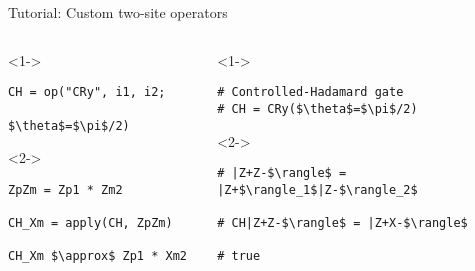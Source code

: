 \begin{frame}[fragile]{Tutorial: Custom two-site operators}


\begin{columns}

\begin{column}{5cm}

\begin{onlyenv}<1->

\begin{lstlisting}[language=JuliaLocal, style=julia, mathescape, basicstyle=\small]
CH = op("CRy", i1, i2;
             $\theta$=$\pi$/2)
\end{lstlisting}

\end{onlyenv}

\begin{onlyenv}<2->

\begin{lstlisting}[language=JuliaLocal, style=julia, mathescape, basicstyle=\small]
ZpZm = Zp1 * Zm2

CH_Xm = apply(CH, ZpZm)

CH_Xm $\approx$ Zp1 * Xm2
\end{lstlisting}

\end{onlyenv}

\end{column}

\begin{column}{5cm}

\begin{onlyenv}<1->

\begin{lstlisting}[style=julia, numbers=none, mathescape, basicstyle=\small]
# Controlled-Hadamard gate
# CH = CRy($\theta$=$\pi$/2)
\end{lstlisting}

\end{onlyenv}

\begin{onlyenv}<2->

\begin{lstlisting}[style=julia, numbers=none, mathescape, basicstyle=\small]
# |Z+Z-$\rangle$ = |Z+$\rangle_1$|Z-$\rangle_2$

# CH|Z+Z-$\rangle$ = |Z+X-$\rangle$

# true
\end{lstlisting}

\end{onlyenv}

\end{column}

\end{columns}

\end{frame}
